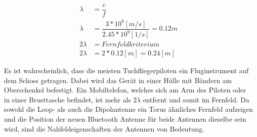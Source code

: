 \begin{eqnarray}
\lambda &=\dfrac{c}{f} \\
\lambda &=\dfrac{3*10^{8} [m/s]}{2.45*10^{9} [1/s]}=0.12m\\ 
2\lambda &= Fernfeldkriterium\\ 
2\lambda &= 2*0.12[m] =0.24 [m] \label{eq:Fernfeld}
\end{eqnarray}

Es ist wahrscheinlich, dass die meisten  Tuchfliegerpiloten ein Fluginstrument auf dem Schoss getragen. Dabei wird das Gerät in einer Hülle mit Bändern am Oberschenkel befestigt. Ein Mobiltelefon, welches sich am Arm des Piloten oder in einer Brusttasche befindet, ist  mehr als $2\lambda$ entfernt und somit im Fernfeld. Da sowohl die Loop- als auch die Dipolantenne ein Torus ähnliches Fernfeld aufzeigen und die Position der neuen Bluetooth Antenne für beide Antennen dieselbe sein wird, sind die Nahfeldeigenschaften der Antennen von Bedeutung.

